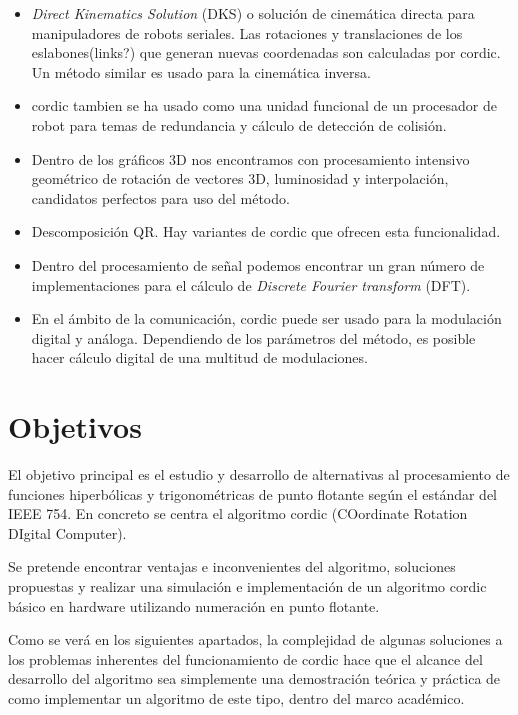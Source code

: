 \begin{itemize}
  \item \textit{Direct Kinematics Solution} (DKS) o solución de cinemática directa para manipuladores de robots seriales. Las rotaciones y translaciones de los eslabones(links?) que generan nuevas coordenadas son calculadas por \gls{cordic}. Un método similar es usado para la cinemática inversa.
  
  \item \gls{cordic} tambien se ha usado como una unidad funcional de un procesador de robot para temas de redundancia y cálculo de detección de colisión.
  
  \item Dentro de los gráficos 3D nos encontramos con procesamiento intensivo geométrico de rotación de vectores 3D, luminosidad y interpolación, candidatos perfectos para uso del método.
  
  \item Descomposición QR. Hay variantes de \gls{cordic} que ofrecen esta funcionalidad.
  
  \item  Dentro del procesamiento de señal podemos encontrar un gran número de implementaciones para el cálculo de \textit{Discrete Fourier transform} (DFT).
  
  \item En el ámbito de la comunicación, \gls{cordic} puede ser usado para la modulación digital y análoga. Dependiendo de los parámetros del método, es posible hacer cálculo digital de una multitud de modulaciones.
\end{itemize}

\section{Objetivos}
\label{objetivos}

El objetivo principal es el estudio y desarrollo de alternativas al procesamiento de funciones hiperbólicas y trigonométricas de punto flotante según el estándar del IEEE 754. En concreto se centra el algoritmo \gls{cordic} (COordinate Rotation DIgital Computer).

Se pretende encontrar ventajas e inconvenientes del algoritmo, soluciones propuestas y realizar una simulación e implementación de un algoritmo \gls{cordic} básico en hardware utilizando numeración en punto flotante.

Como se verá en los siguientes apartados, la complejidad de algunas soluciones a los problemas inherentes del funcionamiento de \gls{cordic} hace que el alcance del desarrollo del algoritmo sea simplemente una demostración teórica y práctica de como implementar un algoritmo de este tipo, dentro del marco académico.

